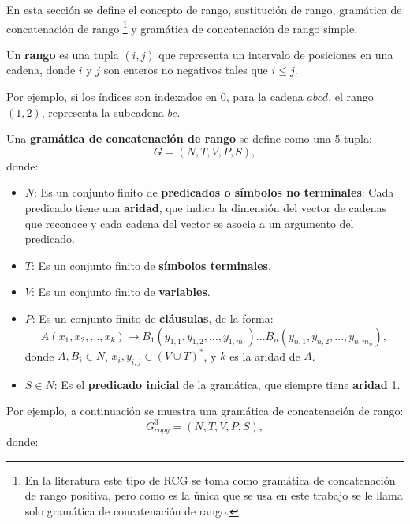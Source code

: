 En esta sección se define el concepto de rango, sustitución de rango, gramática de concatenación de rango \footnote{En la literatura este tipo de RCG se toma como gramática de concatenación de rango positiva, pero como es la única que
    se usa en este trabajo se le llama solo gramática de concatenación de rango.} y gramática de concatenación de rango simple.

\begin{definition}
    Un \textbf{rango} es una tupla $(i, j)$ que representa un intervalo de posiciones en una cadena, donde $i$ y $j$ son enteros no negativos tales que $i \leq j$.    
\end{definition}

Por ejemplo, si los índices son indexados en 0, para la cadena $abcd$, el rango $(1,2)$, representa la subcadena $bc$.

\begin{definition}
    Una \textbf{gramática de concatenación de rango} se define como una 5-tupla:
    \[
        G = (N, T, V, P, S),
    \]
    donde:
    
    \begin{itemize}
        \item $N$: Es un conjunto finito de \textbf{predicados o símbolos no terminales}: Cada predicado tiene una \textbf{aridad}, que indica la dimensión del vector de cadenas que reconoce y cada cadena del vector se asocia a un argumento del predicado.
        \item $T$: Es un conjunto finito de \textbf{símbolos terminales}.
        \item $V$: Es un conjunto finito de \textbf{variables}.
        \item $P$: Es un conjunto finito de \textbf{cláusulas}, de la forma:
              \[
                  A(x_1, x_2, \ldots, x_k) \to B_1(y_{1,1}, y_{1,2}, \ldots, y_{1,m_1}) \ldots B_n(y_{n,1}, y_{n,2}, \ldots, y_{n,m_n}),
              \]
              donde $A, B_i \in N$, $x_i, y_{i,j} \in (V \cup T)^*$, y $k$ es la aridad de $A$.
        \item $S \in N$: Es el \textbf{predicado inicial} de la gramática, que siempre tiene \textbf{aridad} 1.
    \end{itemize}
\end{definition}


Por ejemplo, a continuación se muestra una gramática de concatenación de rango:
\label{g_3copy}
\[
    G^3_{copy} = (N, T, V, P, S),
\]
donde:

